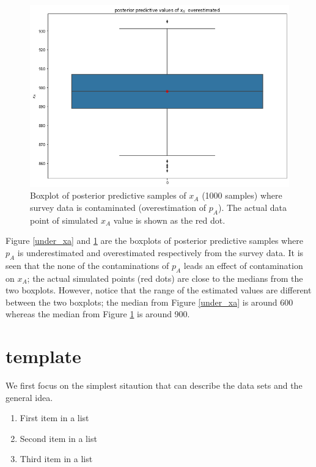 \documentclass[
10pt, %
a4paper, %
oneside, %
headinclude,footinclude, %
BCOR5mm, %
]{scrartcl}
\begin{document}
\begin{figure}[htb]
	\centering
	\includegraphics[width=1\linewidth]{Figures/early_contamination_over-xa.png}
	\caption{Boxplot of posterior predictive samples of $x_A$ (1000 samples) where survey data is contaminated (overestimation of $p_A$).  The actual data point of simulated $x_A$ value is shown as the red dot.}
	\label{over_xa}
\end{figure}

Figure \ref{under_xa} and \ref{over_xa} are the boxplots of posterior predictive samples where $p_A$ is underestimated and overestimated respectively from the survey data. It is seen that the none of the contaminations of $p_A$ leads an effect of contamination on $x_A$; the actual simulated points (red dots) are close to the medians from the two boxplots. However, notice that the range of the estimated values are different between the two boxplots; the median from Figure \ref{under_xa} is around 600 whereas the median from Figure \ref{over_xa} is around 900. 




\section{template}
We first focus on the simplest sitaution that can describe the data sets and the general idea.


\begin{enumerate}[noitemsep] %
\item First item in a list
\item Second item in a list
\item Third item in a list
\end{enumerate}
\end{document}
